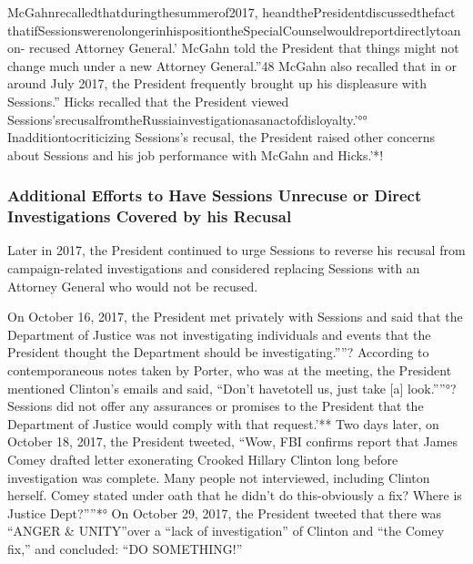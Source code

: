 McGahnrecalledthatduringthesummerof2017, heandthePresidentdiscussedthefact thatifSessionswerenolongerinhispositiontheSpecialCounselwouldreportdirectlytoanon- recused Attorney General.'
McGahn told the President that things might not change much under a new Attorney General.”48
McGahn also recalled that in or around July 2017, the President frequently brought up his displeasure with Sessions.”
Hicks recalled that the President viewed Sessions'srecusalfromtheRussiainvestigationasanactofdisloyalty.'°°
Inadditiontocriticizing Sessions's recusal, the President raised other concerns about Sessions and his job performance with McGahn and Hicks.'*!

\subsubsection{Additional Efforts to Have Sessions Unrecuse or Direct Investigations Covered by his Recusal}

Later in 2017, the President continued to urge Sessions to reverse his recusal from campaign-related investigations and considered replacing Sessions with an Attorney General who would not be recused.

On October 16, 2017, the President met privately with Sessions and said that the Department of Justice was not investigating individuals and events that the President thought the Department should be investigating.””?
According to contemporaneous notes taken by Porter, who was at the meeting, the President mentioned Clinton's emails and said, “Don't havetotell us, just take [a] look.””°?
Sessions did not offer any assurances or promises to the President that the Department of Justice would comply with that request.'**
Two days later, on October 18, 2017, the President tweeted, “Wow, FBI confirms report that James Comey drafted letter exonerating Crooked Hillary Clinton long before investigation was complete.
Many people not interviewed, including Clinton herself.
Comey stated under oath that he didn't do this-obviously a fix? Where is Justice Dept?””*° On October 29, 2017, the President tweeted that there was “ANGER & UNITY”over a “lack of investigation” of Clinton and “the Comey fix,” and concluded: “DO SOMETHING!”

